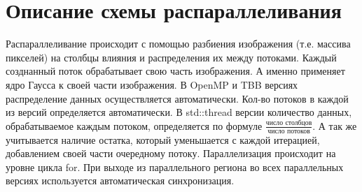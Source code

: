 \documentclass{report}
\begin{document}
\section*{Описание схемы распараллеливания}
\par Распараллеливание происходит с помощью разбиения изображения (т.е. массива пикселей) на столбцы влияния и распределения их между потоками. Каждый созднанный поток обрабатывает свою часть изображения. А именно применяет ядро Гаусса к своей части изображения. В OpenMP и TBB версиях распределение данных осуществляется автоматически. Кол-во потоков в каждой из версий определяется автоматически. В std::thread версии количество данных, обрабатываемое каждым потоком, определяется по формуле $\frac{\text{число столбцов}}{\text{число потоков}}$. А так же учитывается наличие остатка, который уменьшается с каждой итерацией, добавлением своей части очередному потоку. Параллелизация происходит на уровне цикла for. При выходе из параллельного региона во всех параллельных версиях используется автоматическая синхронизация.

\newpage

\end{document}
